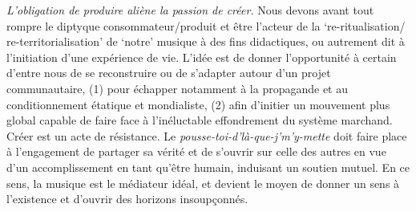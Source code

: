 \documentclass{article}
\begin{document}
\bigskip

\textit{L’obligation de produire aliène la passion de créer. 
}%
Nous devons avant tout rompre le diptyque consommateur/produit et être l'acteur de la `re-ritualisation/ re-territorialisation' de `notre' musique à des fins didactiques, ou autrement dit à l'initiation d'une expérience de vie.
%
L’idée est de donner l’opportunité à certain d’entre nous de se reconstruire ou de s’adapter autour d’un projet communautaire, (1) pour échapper notamment à la propagande et au conditionnement étatique et mondialiste, (2) afin d’initier un mouvement plus global capable de faire face à l’inéluctable effondrement du système marchand. Créer est un acte de résistance. Le \textit{pousse-toi-d'là-que-j'm'y-mette} doit faire place à l'engagement de partager sa vérité et de s'ouvrir sur celle des autres en vue d'un accomplissement en tant qu'être humain, induisant un soutien mutuel. En ce sens, la musique est le médiateur idéal, et devient le moyen de donner un sens à l’existence et d'ouvrir des horizons insoupçonnés. 


\bigskip
\end{document}
